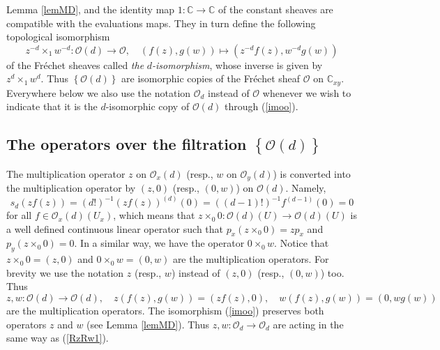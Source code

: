 \documentclass[12pt,reqno]{amsart}%
\theoremstyle{plain}
\numberwithin{theorem}{section} \numberwithin{equation}{section}
\numberwithin{lemma}{section}
\numberwithin{remark}{section}
\numberwithin{example}{section}
\numberwithin{proposition}{section}
\numberwithin{definition}{section}
\numberwithin{corollary}{section}
\begin{document}
Lemma \ref{lemMD}, and the identity map $1:\mathbb{C}\rightarrow\mathbb{C}$ of
the constant sheaves are compatible with the evaluations maps. They in turn
define the following topological isomorphism
\begin{equation}
z^{-d}\times_{1}w^{-d}:\mathcal{O}\left(  d\right)  \rightarrow\mathcal{O}%
,\quad\left(  f\left(  z\right)  ,g\left(  w\right)  \right)  \mapsto\left(
z^{-d}f\left(  z\right)  ,w^{-d}g\left(  w\right)  \right)  \label{imoo}%
\end{equation}
of the Fr\'{e}chet sheaves called \textit{the }$d$\textit{-isomorphism}, whose
inverse is given by $z^{d}\times_{1}w^{d}$. Thus $\left\{  \mathcal{O}\left(
d\right)  \right\}  $ are isomorphic copies of the Fr\'{e}chet sheaf
$\mathcal{O}$ on $\mathbb{C}_{xy}$. Everywhere below we also use the notation
$\mathcal{O}_{d}$ instead of $\mathcal{O}$ whenever we wish to indicate that
it is the $d$-isomorphic copy of $\mathcal{O}\left(  d\right)  $ through
(\ref{imoo}).

\subsection{The operators over the filtration $\left\{  \mathcal{O}\left(
d\right)  \right\}  $\label{subsecOF}}

The multiplication operator $z$ on $\mathcal{O}_{x}\left(  d\right)  $ (resp.,
$w$ on $\mathcal{O}_{y}\left(  d\right)  $) is converted into the
multiplication operator by $\left(  z,0\right)  $ (resp., $\left(  0,w\right)
$) on $\mathcal{O}\left(  d\right)  $. Namely,%
\[
s_{d}\left(  zf\left(  z\right)  \right)  =\left(  d!\right)  ^{-1}\left(
zf\left(  z\right)  \right)  ^{\left(  d\right)  }\left(  0\right)  =\left(
\left(  d-1\right)  !\right)  ^{-1}f^{\left(  d-1\right)  }\left(  0\right)
=0
\]
for all $f\in\mathcal{O}_{x}\left(  d\right)  \left(  U_{x}\right)  $, which
means that $z\times_{0}0:\mathcal{O}\left(  d\right)  \left(  U\right)
\rightarrow\mathcal{O}\left(  d\right)  \left(  U\right)  $ is a well defined
continuous linear operator such that $p_{x}\left(  z\times_{0}0\right)
=zp_{x}$ and $p_{y}\left(  z\times_{0}0\right)  =0$. In a similar way, we have
the operator $0\times_{0}w$. Notice that $z\times_{0}0=\left(  z,0\right)  $
and $0\times_{0}w=\left(  0,w\right)  $ are the multiplication operators. For
brevity we use the notation $z$ (resp., $w$) instead of $\left(  z,0\right)  $
(resp., $\left(  0,w\right)  $) too. Thus%
\begin{equation}
z,w:\mathcal{O}\left(  d\right)  \rightarrow\mathcal{O}\left(  d\right)
,\quad z\left(  f\left(  z\right)  ,g\left(  w\right)  \right)  =\left(
zf\left(  z\right)  ,0\right)  ,\quad w\left(  f\left(  z\right)  ,g\left(
w\right)  \right)  =\left(  0,wg\left(  w\right)  \right)  \label{RzRw1}%
\end{equation}
are the multiplication operators. The isomorphism (\ref{imoo}) preserves both
operators $z$ and $w$ (see Lemma \ref{lemMD}). Thus $z,w:\mathcal{O}%
_{d}\rightarrow\mathcal{O}_{d}$ are acting in the same way as (\ref{RzRw1}).
\end{document}
